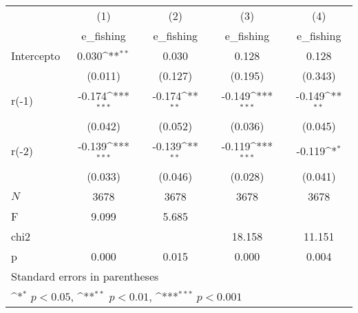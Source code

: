 {
\def\sym#1{\ifmmode^{#1}\else\(^{#1}\)\fi}
\begin{longtable}{l*{4}{c}}
\hline\hline\endfirsthead\hline\endhead\hline\endfoot\endlastfoot
            &\multicolumn{1}{c}{(1)}&\multicolumn{1}{c}{(2)}&\multicolumn{1}{c}{(3)}&\multicolumn{1}{c}{(4)}\\
            &\multicolumn{1}{c}{e\_fishing}&\multicolumn{1}{c}{e\_fishing}&\multicolumn{1}{c}{e\_fishing}&\multicolumn{1}{c}{e\_fishing}\\
\hline
Intercepto  &       0.030\sym{**} &       0.030         &       0.128         &       0.128         \\
            &     (0.011)         &     (0.127)         &     (0.195)         &     (0.343)         \\
r(-1)       &      -0.174\sym{***}&      -0.174\sym{**} &      -0.149\sym{***}&      -0.149\sym{**} \\
            &     (0.042)         &     (0.052)         &     (0.036)         &     (0.045)         \\
r(-2)       &      -0.139\sym{***}&      -0.139\sym{**} &      -0.119\sym{***}&      -0.119\sym{*}  \\
            &     (0.033)         &     (0.046)         &     (0.028)         &     (0.041)         \\
\hline
\(N\)       &        3678         &        3678         &        3678         &        3678         \\
F           &       9.099         &       5.685         &                     &                     \\
chi2        &                     &                     &      18.158         &      11.151         \\
p           &       0.000         &       0.015         &       0.000         &       0.004         \\
\hline\hline
\multicolumn{5}{l}{\footnotesize Standard errors in parentheses}\\
\multicolumn{5}{l}{\footnotesize \sym{*} \(p<0.05\), \sym{**} \(p<0.01\), \sym{***} \(p<0.001\)}\\
\end{longtable}
}
